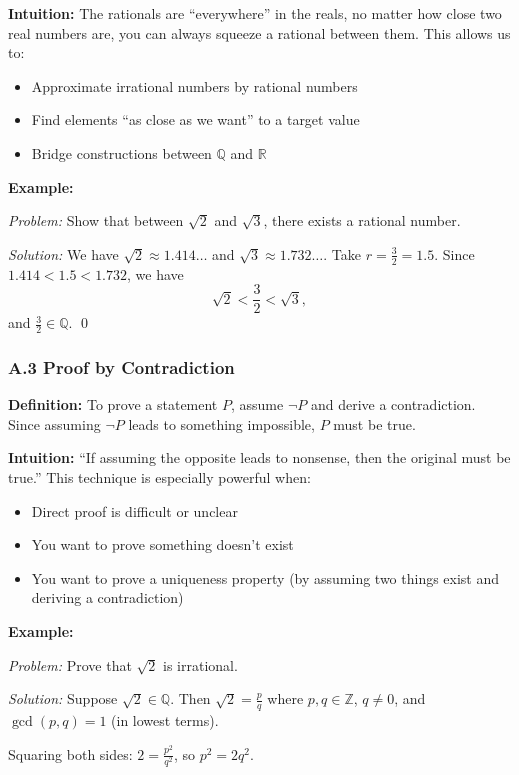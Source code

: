 \textbf{Intuition:}
The rationals are ``everywhere'' in the reals, no matter how close two real numbers are, you can always squeeze a rational between them. This allows us to:
\begin{itemize}
    \item Approximate irrational numbers by rational numbers
    \item Find elements ``as close as we want'' to a target value
    \item Bridge constructions between $\mathbb{Q}$ and $\mathbb{R}$
\end{itemize}

\textbf{Example:}

\textit{Problem:} Show that between $\sqrt{2}$ and $\sqrt{3}$, there exists a rational number.

\textit{Solution:} We have $\sqrt{2} \approx 1.414\ldots$ and $\sqrt{3} \approx 1.732\ldots$. Take $r = \frac{3}{2} = 1.5$. Since $1.414 < 1.5 < 1.732$, we have 
\[\sqrt{2} < \frac{3}{2} < \sqrt{3},\]
and $\frac{3}{2} \in \mathbb{Q}$. \qed

\subsubsection*{A.3 Proof by Contradiction}

\textbf{Definition:}
To prove a statement $P$, assume $\neg P$ and derive a contradiction. Since assuming $\neg P$ leads to something impossible, $P$ must be true.

\textbf{Intuition:}
``If assuming the opposite leads to nonsense, then the original must be true.'' This technique is especially powerful when:
\begin{itemize}
    \item Direct proof is difficult or unclear
    \item You want to prove something doesn't exist
    \item You want to prove a uniqueness property (by assuming two things exist and deriving a contradiction)
\end{itemize}

\textbf{Example:}

\textit{Problem:} Prove that $\sqrt{2}$ is irrational.

\textit{Solution:} Suppose $\sqrt{2} \in \mathbb{Q}$. Then $\sqrt{2} = \frac{p}{q}$ where $p, q \in \mathbb{Z}$, $q \neq 0$, and $\gcd(p,q) = 1$ (in lowest terms). 

Squaring both sides: $2 = \frac{p^2}{q^2}$, so $p^2 = 2q^2$. 

